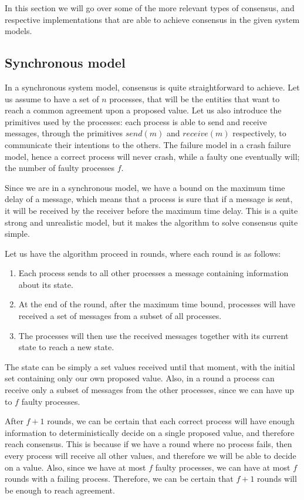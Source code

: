 In this section we will go over some of the more relevant types of consensus, and respective implementations that are able to achieve consensus in the given system models.


\subsection{Synchronous model}\label{sec:Synchronous model}
In a synchronous system model, consensus is quite straightforward to achieve. Let us assume to have a set of $n$ processes, that will be the entities that want to reach a common agreement upon a proposed value. Let us also introduce the primitives used by the processes: each process is able to send and receive messages, through the primitives $send(m)$ and $receive(m)$ respectively, to communicate their intentions to the others. The failure model in a crash failure model, hence a correct process will never crash, while a faulty one eventually will; the number of faulty processes $f$.

Since we are in a synchronous model, we have a bound on the maximum time delay of a message, which means that a process is sure that if a message is sent, it will be received by the receiver before the maximum time delay. This is a quite strong and unrealistic model, but it makes the algorithm to solve consensus quite simple.

Let us have the algorithm proceed in rounds, where each round is as follows:
\begin{enumerate}
    \item Each process sends to all other processes a message containing information about its state.
    \item At the end of the round, after the maximum time bound, processes will have received a set of messages from a subset of all processes.
    \item The processes will then use the received messages together with its current state to reach a new state.
\end{enumerate}

The state can be simply a set values received until that moment, with the initial set containing only our own proposed value. Also, in a round a process can receive only a subset of messages from the other processes, since we can have up to $f$ faulty processes.

After $f+1$ rounds, we can be certain that each correct process will have enough information to deterministically decide on a single proposed value, and therefore reach consensus. This is because if we have a round where no process fails, then every process will receive all other values, and therefore we will be able to decide on a value. Also, since we have at most $f$ faulty processes, we can have at most $f$ rounds with a failing process. Therefore, we can be certain that $f+1$ rounds will be enough to reach agreement.

